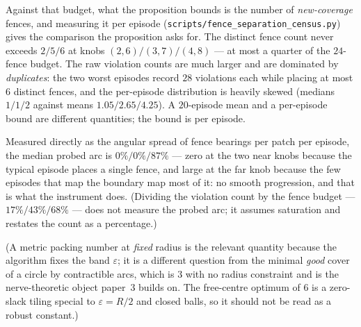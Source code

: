 \documentclass[11pt]{article}
\theoremstyle{definition}
\theoremstyle{remark}
\begin{document}
\begin{itemize}
  Against that budget, what the proposition bounds is the number of \emph{new-coverage} fences, and measuring it per episode (\texttt{scripts/\allowbreak fence\_\allowbreak separation\_\allowbreak census.py}) gives the comparison the proposition asks for. The distinct fence count never exceeds $2 / 5 / 6$ at knobs $(2,6)/(3,7)/(4,8)$ --- at most a quarter of the $24$-fence budget. The raw violation counts are much larger and are dominated by \emph{duplicates}: the two worst episodes record $28$ violations each while placing at most $6$ distinct fences, and the per-episode distribution is heavily skewed (medians $1 / 1 / 2$ against means $1.05 / 2.65 / 4.25$). A $20$-episode mean and a per-episode bound are different quantities; the bound is per episode.

  Measured directly as the angular spread of fence bearings per patch per episode, the median probed arc is $0\% / 0\% / 87\%$ --- zero at the two near knobs because the typical episode places a single fence, and large at the far knob because the few episodes that map the boundary map most of it: no smooth progression, and that is what the instrument does. (Dividing the violation count by the fence budget --- $17\% / 43\% / 68\%$ --- does not measure the probed arc; it assumes saturation and restates the count as a percentage.)

  (A metric packing number at \emph{fixed} radius is the relevant quantity because the algorithm fixes the band $\varepsilon$; it is a different question from the minimal \emph{good} cover of a circle by contractible arcs, which is $3$ with no radius constraint and is the nerve-theoretic object paper~3 builds on. The free-centre optimum of $6$ is a zero-slack tiling special to $\varepsilon = R/2$ and closed balls, so it should not be read as a robust constant.)
\end{itemize}
\end{document}
